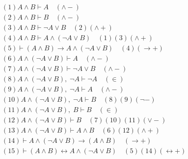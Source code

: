 \documentclass{article}
\begin{document}
\[
\begin{aligned}
&(1) A \wedge B \vdash A \quad (\wedge -) \\
&(2) A \wedge B \vdash B \quad (\wedge -) \\
&(3) A \wedge B \vdash \neg A \vee B \quad (2)(\wedge +) \\
&(4) A \wedge B \vdash A \wedge (\neg A \vee B) \quad (1)(3)(\wedge +) \\
&(5) \vdash (A \wedge B) \to A \wedge (\neg A \vee B) \quad (4)(\to +) \\
&(6) A \wedge (\neg A \vee B) \vdash A \quad (\wedge -) \\
&(7) A \wedge (\neg A \vee B) \vdash \neg A \vee B \quad (\wedge -) \\
&(8) A \wedge (\neg A \vee B),\; \neg A \vdash \neg A \quad (\in) \\
&(9) A \wedge (\neg A \vee B),\; \neg A \vdash A \quad (\wedge -) \\
&(10) A \wedge (\neg A \vee B),\; \neg A \vdash B \quad (8)(9)(\neg -) \\
&(11) A \wedge (\neg A \vee B),\; B \vdash B \quad (\in) \\
&(12) A \wedge (\neg A \vee B) \vdash B \quad (7)(10)(11)(\vee -) \\
&(13) A \wedge (\neg A \vee B) \vdash A \wedge B \quad (6)(12)(\wedge +) \\
&(14) \vdash A \wedge (\neg A \vee B) \to (A \wedge B) \quad(\to +) \\
&(15) \vdash (A \wedge B) \leftrightarrow A \wedge (\neg A \vee B) \quad (5)(14)(\leftrightarrow +)
\end{aligned}    
\]
\end{document}
